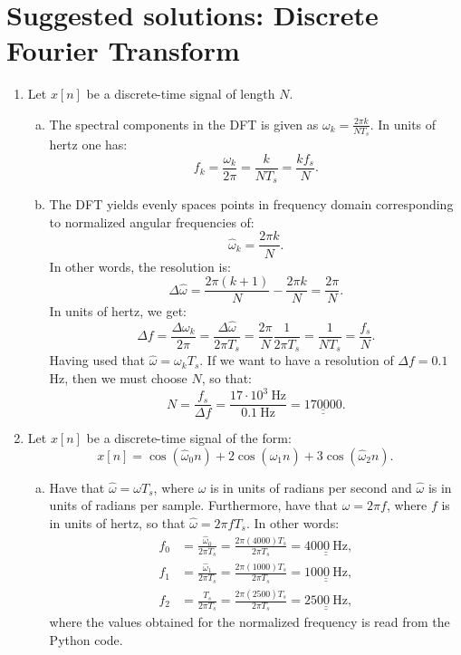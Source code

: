 \newpage
\section{Suggested solutions: Discrete Fourier Transform}

\begin{enumerate}
\item Let $x[n]$ be a discrete-time signal of length $N$.

\begin{enumerate}[a)]
\item The spectral components in the DFT is given as $\omega_{k}=\frac{2\pi k}{NT_{s}}$. In units of hertz one has:
$$f_{k}=\frac{\omega_k}{2\pi}=\frac{k}{NT_{s}}=\frac{kf_{s}}{N}.$$

\item The DFT yields evenly spaces points in frequency domain corresponding to normalized angular frequencies of:
$$\hat{\omega}_{k}=\frac{2\pi k}{N}.$$
In other words, the resolution is:
$$\Delta\hat{\omega}=\frac{2\pi (k+1)}{N}-\frac{2\pi k}{N}=\frac{2\pi}{N}.$$
In units of hertz, we get:
$$\Delta f = \frac{\Delta\omega_{k}}{2\pi}=\frac{\Delta\hat{\omega}}{2\pi T_{s}}=\frac{2\pi}{N}\frac{1}{2\pi T_{s}}=\frac{1}{N T_{s}}=\frac{f_{s}}{N}.$$
Having used that $\hat{\omega}=\omega_{k}T_{s}$. If we want to have a resolution of $\Delta f=0.1$ Hz, then we must choose $N$, so that:
$$N=\frac{f_{s}}{\Delta f}=\frac{17\cdot 10^{3}\ \text{Hz}}{0.1\ \text{Hz}}=\underline{\underline{170000}}.$$
\end{enumerate}

\item Let $x[n]$ be a discrete-time signal of the form:
$$x[n]=\cos(\hat{\omega}_0 n)+2\cos(\hat{\omega}_1 n)+3\cos(\hat{\omega}_2 n).$$

\begin{enumerate}[a)]
\item Have that $\hat{\omega}=\omega T_{s}$, where $\omega$ is in units of radians per second and $\hat{\omega}$ is in units of radians per sample. Furthermore, have that $\omega=2\pi f$, where $f$ is in units of hertz, so that $\hat{\omega}=2\pi f T_{s}$. In other words:
\begin{align*}
    f_{0} &= \frac{\hat{\omega}_{0}}{2\pi T_{s}}=\frac{2\pi (4000)T_{s}}{2\pi T_{s}}=\underline{\underline{4000\ \text{Hz}}},  \\
    f_{1} &= \frac{\hat{\omega}_{1}}{2\pi T_{s}}=\frac{2\pi (1000)T_{s}}{2\pi T_{s}}=\underline{\underline{1000\ \text{Hz}}},  \\
    f_{2} &= \frac{T_{s}}{2\pi T_{s}}=\frac{2\pi (2500)T_{s}}{2\pi T_{s}}=\underline{\underline{2500\  \text{Hz}}}, 
\end{align*}
where the values obtained for the normalized frequency is read from the Python code. 


\end{enumerate}
\end{enumerate}
